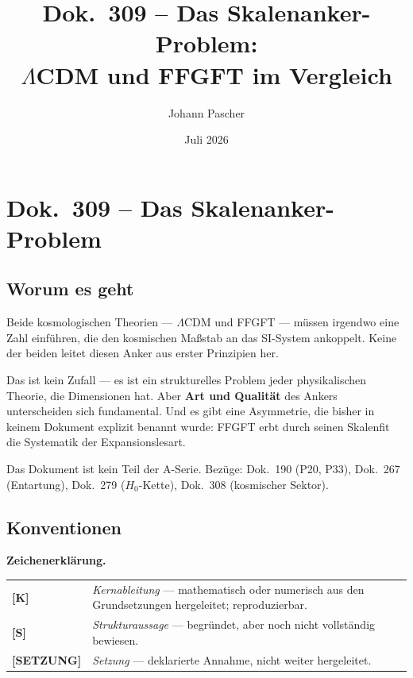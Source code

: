 \documentclass[11pt]{report}
\title{Dok.~309 -- Das Skalenanker-Problem:\\
$\Lambda$CDM und FFGFT im Vergleich}
\author{Johann Pascher}
\date{Juli 2026}
\begin{document}
\maketitle
\tableofcontents

\chapter*{Dok.~309 -- Das Skalenanker-Problem}

\section*{Worum es geht}

Beide kosmologischen Theorien — $\Lambda$CDM und FFGFT — müssen irgendwo
eine Zahl einführen, die den kosmischen Maßstab an das SI-System ankoppelt.
Keine der beiden leitet diesen Anker aus erster Prinzipien her.

Das ist kein Zufall — es ist ein strukturelles Problem jeder physikalischen
Theorie, die Dimensionen hat. Aber \textbf{Art und Qualität} des Ankers
unterscheiden sich fundamental. Und es gibt eine Asymmetrie, die bisher
in keinem Dokument explizit benannt wurde: FFGFT erbt durch seinen
Skalenfit die Systematik der Expansionslesart.

Das Dokument ist kein Teil der A-Serie.
Bezüge: Dok.~190 (P20, P33), Dok.~267 (Entartung), Dok.~279 ($H_0$-Kette),
Dok.~308 (kosmischer Sektor).

\section*{Konventionen}

\noindent\textbf{Zeichenerklärung.}

\medskip
\begin{tabular}{@{}lp{11cm}}
\textbf{[K]}       & \emph{Kernableitung} — mathematisch oder numerisch
                     aus den Grundsetzungen hergeleitet; reproduzierbar. \\[4pt]
\textbf{[S]}       & \emph{Strukturaussage} — begründet, aber noch nicht
                     vollständig bewiesen. \\[4pt]
\textbf{[SETZUNG]} & \emph{Setzung} — deklarierte Annahme, nicht weiter
                     hergeleitet. \\
\end{tabular}
\end{document}
